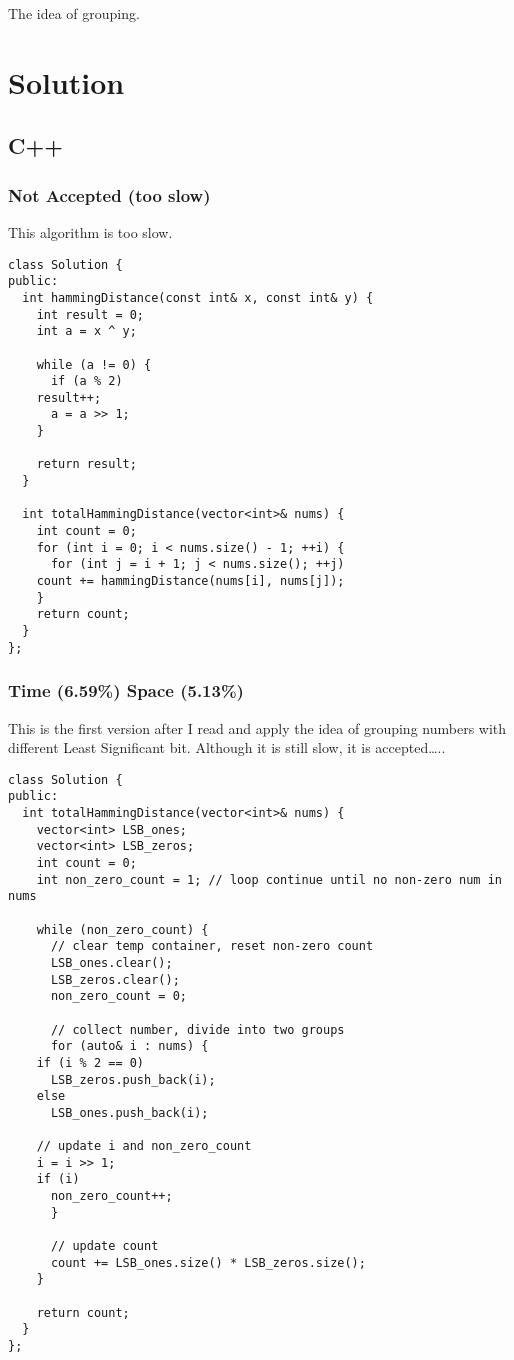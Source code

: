 \documentclass[12pt]{book}
\begin{document}
The idea of grouping.
\section{Solution}
\label{sec:orgcdeeb78}
\subsection{C++}
\label{sec:orgd92db4f}
\subsubsection{Not Accepted (too slow)}
\label{sec:orgac3f67c}
This algorithm is too slow.
\begin{verbatim}
class Solution {
public:
  int hammingDistance(const int& x, const int& y) {
    int result = 0;
    int a = x ^ y;

    while (a != 0) {
      if (a % 2)
	result++;
      a = a >> 1;
    }

    return result;
  }  

  int totalHammingDistance(vector<int>& nums) {
    int count = 0;
    for (int i = 0; i < nums.size() - 1; ++i) {
      for (int j = i + 1; j < nums.size(); ++j)
	count += hammingDistance(nums[i], nums[j]);
    }
    return count;
  }
};
\end{verbatim}
\subsubsection{Time (6.59\%) Space (5.13\%)}
\label{sec:org7cc8220}
This is the first version after I read and apply the idea of grouping numbers with different Least Significant bit. Although it is still slow, it is accepted\ldots{}..
\begin{verbatim}
class Solution {
public:
  int totalHammingDistance(vector<int>& nums) {
    vector<int> LSB_ones;
    vector<int> LSB_zeros;
    int count = 0;
    int non_zero_count = 1; // loop continue until no non-zero num in nums

    while (non_zero_count) {
      // clear temp container, reset non-zero count
      LSB_ones.clear();
      LSB_zeros.clear();
      non_zero_count = 0;

      // collect number, divide into two groups
      for (auto& i : nums) {
	if (i % 2 == 0)
	  LSB_zeros.push_back(i);
	else 
	  LSB_ones.push_back(i);

	// update i and non_zero_count
	i = i >> 1;
	if (i)
	  non_zero_count++;
      }

      // update count 
      count += LSB_ones.size() * LSB_zeros.size();
    }

    return count;
  }
};
\end{verbatim}
\end{document}
